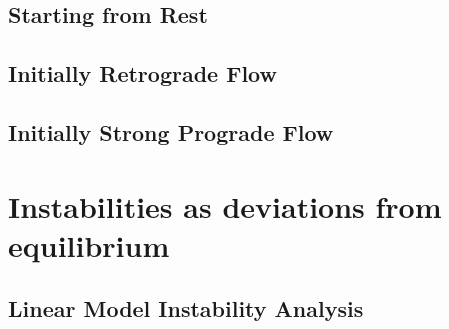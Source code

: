 \subsection*{Starting from Rest}

\subsection*{{Initially Retrograde Flow}}

\subsection*{Initially Strong Prograde Flow}





%
%
%
%
%
%
%



\section{Instabilities as deviations from equilibrium}

\subsection*{Linear Model Instability Analysis}

